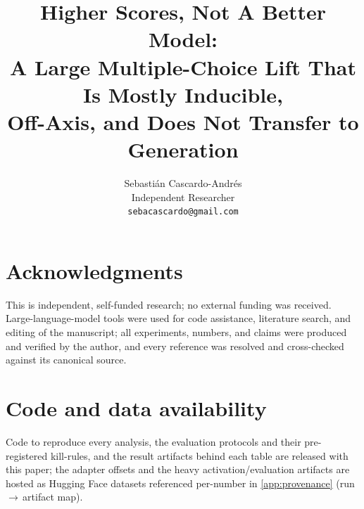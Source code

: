 \documentclass[11pt]{article}
\title{\LARGE\bfseries Higher Scores, Not A Better Model:\\
A Large Multiple-Choice Lift That Is Mostly Inducible,\\ Off-Axis, and Does Not Transfer to Generation}
\author{%
  Sebasti\'an Cascardo-Andr\'es\\
  Independent Researcher\\
  \texttt{sebacascardo@gmail.com}\\
}
\date{}
\begin{document}
\maketitle

\begin{abstract}

\end{abstract}









\section*{Acknowledgments}
This is independent, self-funded research; no external funding was received.
Large-language-model tools were used for code assistance, literature search, and
editing of the manuscript; all experiments, numbers, and claims were produced and
verified by the author, and every reference was resolved and cross-checked against
its canonical source.

\section*{Code and data availability}
Code to reproduce every analysis, the evaluation protocols and their pre-registered
kill-rules, and the result artifacts behind each table are released with this paper;
the adapter offsets and the heavy activation/evaluation artifacts are hosted as
Hugging Face datasets referenced per-number in \cref{app:provenance}
(run\,$\rightarrow$\,artifact map).




\clearpage
\appendix

\end{document}

